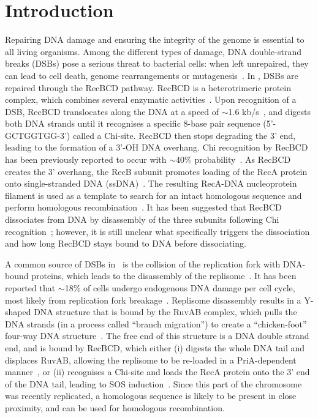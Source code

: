\section*{Introduction}
Repairing DNA damage and ensuring the integrity of the genome is essential to all living organisms. Among the different types of damage, DNA double-strand breaks (DSBs) pose a serious threat to bacterial cells: when left unrepaired, they can lead to cell death, genome rearrangements or mutagenesis~\cite{Wyman2006}. In \ecoli, DSBs are repaired through the RecBCD pathway. RecBCD is a heterotrimeric protein complex, which combines several enzymatic activities~\cite{Dillingham2008}. Upon recognition of a DSB, RecBCD translocates along the DNA at a speed of $\sim$1.6 kb/s~\cite{Wiktor2018}, and digests both DNA strands until it recognises a specific 8-base pair sequence (5'-GCTGGTGG-3') called a Chi-site. RecBCD then stops degrading the 3' end, leading to the formation of a 3'-OH DNA overhang. Chi recognition by RecBCD has been previously reported to occur with $\sim$40\% probability~\cite{Taylor1992,Cockram2015}. As RecBCD creates the 3' overhang, the RecB subunit promotes loading of the RecA protein onto single-stranded DNA (ssDNA)~\cite{Churchill2000, Spies2006}. The resulting RecA-DNA nucleoprotein filament is used as a template to search for an intact homologous sequence and perform homologous recombination~\cite{Wyman2004,Wiktor2021}. It has been suggested that RecBCD dissociates from DNA by disassembly of the three subunits following Chi recognition~\cite{Taylor1999}; however, it is still unclear what specifically triggers the dissociation and how long RecBCD stays bound to DNA before dissociating.

A common source of DSBs in \ecoli\ is the collision of the replication fork with DNA-bound proteins, which leads to the disassembly of the replisome~\cite{Michel1997}. It has been reported that $\sim$18\% of cells undergo endogenous DNA damage per cell cycle, most likely from replication fork breakage~\cite{Sinha2018}. Replisome disassembly results in a Y-shaped DNA structure that is bound by the RuvAB complex, which pulls the DNA strands (in a process called ``branch migration'') to create a ``chicken-foot'' four-way DNA structure~\cite{Seigneur1998}. The free end of this structure is a DNA double strand end, and is bound by RecBCD, which either (i) digests the whole DNA tail and displaces RuvAB, allowing the replisome to be re-loaded in a PriA-dependent manner~\cite{Seigneur1998}, or (ii) recognises a Chi-site and loads the RecA protein onto the 3' end of the DNA tail, leading to SOS induction~\cite{Michel2001}. Since this part of the chromosome was recently replicated, a homologous sequence is likely to be present in close proximity, and can be used for homologous recombination.

